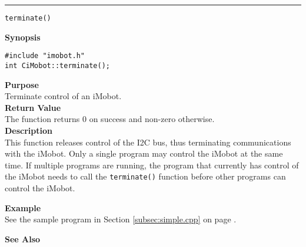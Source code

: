 \noindent
\vspace{5pt}
\rule{6.5in}{0.015in}
\noindent
{\LARGE \texttt{terminate()}}\\
{}

\noindent
{\bf Synopsis}\\
\begin{verbatim}
#include "imobot.h"
int CiMobot::terminate();
\end{verbatim}

\noindent
{\bf Purpose}\\
Terminate control of an iMobot.\\

\noindent
{\bf Return Value}\\
The function returns 0 on success and non-zero otherwise.\\

\noindent
{\bf Description}\\
This function releases control of the I2C bus, thus terminating communications
with the iMobot. Only a single program may control the iMobot at the same time. If multiple programs are running, the program that currently has control of the iMobot needs to call the \texttt{terminate()} function before other programs can control the iMobot.

\noindent
{\bf Example}\\
See the sample program in Section \ref{subsec:simple.cpp} on page \pageref{subsec:simple.cpp}.
\noindent

\noindent
{\bf See Also}\\

